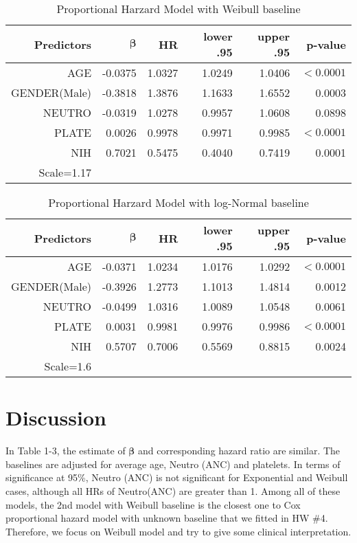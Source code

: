 \documentclass[11pt]{article}
\newcommand{\bbeta}{{\bm \beta}}
\begin{document}
\begin{table}[ht]\label{tab:wei}
\caption{Proportional Harzard Model with Weibull baseline}
\centering
\begin{tabular}{rrrrrr}
  \hline
  \hline
  Predictors & $\bbeta$ & HR & lower .95 & upper .95 & p-value \\ 
  \hline
AGE & -0.0375 & 1.0327 & 1.0249 & 1.0406 & $<0.0001$ \\ 
  GENDER(Male) & -0.3818 & 1.3876 & 1.1633 & 1.6552 & 0.0003 \\ 
  NEUTRO & -0.0319 & 1.0278 & 0.9957 & 1.0608 & 0.0898 \\ 
  PLATE & 0.0026 & 0.9978 & 0.9971 & 0.9985 & $<0.0001$ \\ 
  NIH & 0.7021 & 0.5475 & 0.4040 & 0.7419 & 0.0001 \\ 
   \hline
  Scale=1.17\\
\hline
\end{tabular}
\end{table}


\begin{table}[ht]\label{tab:log}
\caption{Proportional Harzard Model with log-Normal baseline}
\centering
\begin{tabular}{rrrrrr}
  \hline
  \hline
 Predictors & $\bbeta$ & HR & lower .95 & upper .95 & p-value \\ 
  \hline
AGE & -0.0371 & 1.0234 & 1.0176 & 1.0292 & $<0.0001$ \\ 
  GENDER(Male) & -0.3926 & 1.2773 & 1.1013 & 1.4814 & 0.0012 \\ 
  NEUTRO & -0.0499 & 1.0316 & 1.0089 & 1.0548 & 0.0061 \\ 
  PLATE & 0.0031 & 0.9981 & 0.9976 & 0.9986 & $<0.0001$ \\ 
  NIH & 0.5707 & 0.7006 & 0.5569 & 0.8815 & 0.0024 \\ 
   \hline
  Scale=1.6\\
\hline
\end{tabular}
\end{table}

\section{Discussion}

In Table 1-3, the estimate of $\bbeta$ and corresponding hazard ratio are
similar. The baselines are adjusted for average age, Neutro (ANC) and platelets. In terms of significance at 95\%, Neutro (ANC) is not significant for
Exponential and Weibull cases, although all HRs of Neutro(ANC) are greater than
1. Among all of these models, the 2nd model with Weibull baseline is the closest one
to Cox proportional hazard model with unknown baseline that we fitted in HW \#4.
Therefore, we focus on Weibull model and try to give some clinical interpretation.
\end{document}
